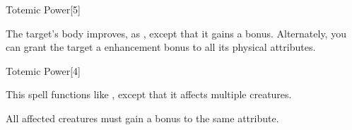\begin{spellsection}[Greater]{Totemic Power}[5]
    \begin{spellheader}
    \end{spellheader}
    \begin{spellcontent}
        \begin{spelltargetinginfo}
        \end{spelltargetinginfo}
        \begin{spelleffects}
            \spelleffect The target's body improves, as , except that it gains a  bonus. Alternately, you can grant the target a  enhancement bonus to all its physical attributes.
            \spelldur \durpersonallong
        \end{spelleffects}
    \end{spellcontent}
    \begin{spellfooter}
    \end{spellfooter}
\end{spellsection}

\begin{spellsection}[Mass]{Totemic Power}[4]
    \begin{spellheader}
    \end{spellheader}
    \begin{spellcontent}
        \begin{spelltargetinginfo}
        \end{spelltargetinginfo}
        \begin{spelleffects}
            \spellspecial This spell functions like , except that it affects multiple creatures.
            \spelldur \durshort
        \end{spelleffects}
    \end{spellcontent}
    \begin{spellfooter}
        \spellnotes All affected creatures must gain a bonus to the same attribute.
    \end{spellfooter}
\end{spellsection}

